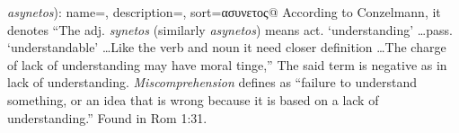 \item[Miscomprehension,]

\textit{asynetos}):
{
    name=,
    description={},
    sort=ασυνετος@
}
According to Conzelmann, it denotes ``The adj. \emph{synetos} (similarly \emph{asynetos}) means act. `understanding' \ldots pass. `understandable' \ldots Like the verb and noun it need closer definition \ldots The charge of lack of understanding may have moral tinge,''  
The said term is negative as in lack of understanding. \emph{Miscomprehension} defines as ``failure to understand something, or an idea that is wrong because it is based on a lack of understanding.''
Found in Rom 1:31.
